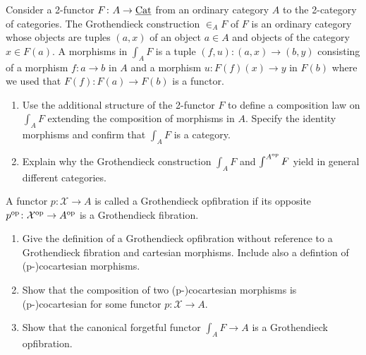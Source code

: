 \begin{Exercise}
	Consider a 2-functor $ F \colon A \to \underline{ \operatorname{Cat} } $ from an ordinary category $ A $ to the 2-category of categories.
	The Grothendieck construction $ \in_A F $ of $ F $ is an ordinary category whose objects are tuples $ ( a , x ) $ of an object $ a \in A $ and objects of the category $ x \in F ( a ) $.
	A morphisms in $ \int_A F $ is a tuple $ ( f , u ) \colon ( a , x ) \to ( b , y ) $
	consisting of a morphism $ f \colon a \to b $ in $ A $ and a morphism $ u \colon F ( f ) ( x ) \to y $ in $ F ( b ) $ where we used that $ F ( f ) \colon F ( a ) \to F ( b ) $ is a functor.
	
	\begin{enumerate}[label=(\alph*)]
		\item 
		Use the additional structure of the 2-functor $ F $ to define a composition law on $ \int_A F $ extending the composition of morphisms in $ A $.
		Specify the identity morphisms and confirm that $ \int_A F $ is a category.
		
		\item 
		Explain why the Grothendieck construction $ \int_A F $ and $ \int^{ A^{ \operatorname{op} } } F $ yield in general different categories.
	\end{enumerate}
	
	A functor $ p \colon \mathcal{ X } \to A $ is called a Grothendieck opfibration if its opposite $ p^{ \operatorname{op} } \colon \mathcal{ X }^{ \operatorname{op} } \to A^{ \operatorname{op} } $ is a Grothendieck fibration.
	
	\begin{enumerate}[resume, label=(\alph*)]
		\item 
		Give the definition of a Grothendieck opfibration without reference to a Grothendieck fibration and cartesian morphisms. 
		Include also a defintion of (p-)cocartesian morphisms.
		
		\item 
		Show that the composition of two (p-)cocartesian morphisms is (p-)cocartesian for some functor $ p \colon \mathcal{ X } \to A $.
		
		\item 
		Show that the canonical forgetful functor $ \int_A F \to  A $ is a Grothendieck opfibration.
	\end{enumerate}
\end{Exercise}

